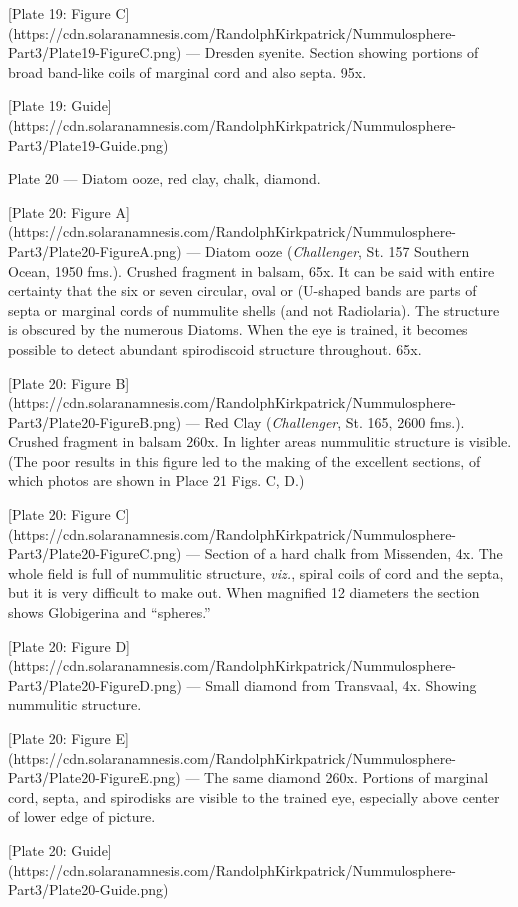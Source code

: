 \documentclass[a4paper, 12pt, oneside]{article}
\begin{document}
[Plate 19: Figure C](https://cdn.solaranamnesis.com/RandolphKirkpatrick/Nummulosphere-Part3/Plate19-FigureC.png) --- Dresden syenite. Section showing portions of broad band-like coils of marginal cord and also septa. 95x.

[Plate 19: Guide](https://cdn.solaranamnesis.com/RandolphKirkpatrick/Nummulosphere-Part3/Plate19-Guide.png)

Plate 20 --- Diatom ooze, red clay, chalk, diamond.

[Plate 20: Figure A](https://cdn.solaranamnesis.com/RandolphKirkpatrick/Nummulosphere-Part3/Plate20-FigureA.png) --- Diatom ooze (\emph{Challenger}, St. 157 Southern Ocean, 1950 fms.). Crushed fragment in balsam, 65x. It can be said with entire certainty that the six or seven circular, oval or (U-shaped bands are parts of septa or marginal cords of nummulite shells (and not Radiolaria). The structure is obscured by the numerous Diatoms. When the eye is trained, it becomes possible to detect abundant spirodiscoid structure throughout. 65x.

[Plate 20: Figure B](https://cdn.solaranamnesis.com/RandolphKirkpatrick/Nummulosphere-Part3/Plate20-FigureB.png) --- Red Clay (\emph{Challenger}, St. 165, 2600 fms.). Crushed fragment in balsam 260x. In lighter areas nummulitic structure is visible. (The poor results in this figure led to the making of the excellent sections, of which photos are shown in Place 21 Figs. C, D.)

[Plate 20: Figure C](https://cdn.solaranamnesis.com/RandolphKirkpatrick/Nummulosphere-Part3/Plate20-FigureC.png) --- Section of a hard chalk from Missenden, 4x. The whole field is full of nummulitic structure, \emph{viz.}, spiral coils of cord and the septa, but it is very difficult to make out. When magnified 12 diameters the section shows Globigerina and ``spheres.''

[Plate 20: Figure D](https://cdn.solaranamnesis.com/RandolphKirkpatrick/Nummulosphere-Part3/Plate20-FigureD.png) --- Small diamond from Transvaal, 4x. Showing nummulitic structure.

[Plate 20: Figure E](https://cdn.solaranamnesis.com/RandolphKirkpatrick/Nummulosphere-Part3/Plate20-FigureE.png) --- The same diamond 260x. Portions of marginal cord, septa, and spirodisks are visible to the trained eye, especially above center of lower edge of picture.

[Plate 20: Guide](https://cdn.solaranamnesis.com/RandolphKirkpatrick/Nummulosphere-Part3/Plate20-Guide.png)
\end{document}
